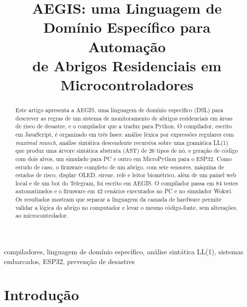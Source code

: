 \documentclass[conference]{IEEEtran}
\begin{document}
\title{AEGIS: uma Linguagem de Domínio Específico para Automação\\
de Abrigos Residenciais em Microcontroladores}

\author{
}

\maketitle

\begin{abstract}
Este artigo apresenta a AEGIS, uma linguagem de domínio específico (DSL)
para descrever as regras de um sistema de monitoramento de abrigos
residenciais em áreas de risco de desastre, e o compilador que a traduz
para Python. O compilador, escrito em JavaScript, é organizado em três
fases: análise léxica por expressões regulares com \textit{maximal munch},
análise sintática descendente recursiva sobre uma gramática LL(1) que
produz uma árvore sintática abstrata (AST) de 26 tipos de nó, e geração de
código com dois alvos, um simulado para PC e outro em MicroPython para o
ESP32. Como estudo de caso, o firmware completo de um abrigo, com sete
sensores, máquina de estados de risco, display OLED, sirene, relé e leitor
biométrico, além de um painel web local e de um bot do Telegram, foi
escrito em AEGIS. O compilador passa em 84 testes automatizados e o
firmware em 42 cenários executados no PC e no simulador Wokwi. Os
resultados mostram que separar a linguagem da camada de hardware permite
validar a lógica do abrigo no computador e levar o mesmo código-fonte,
sem alterações, ao microcontrolador.
\end{abstract}

\begin{IEEEkeywords}
compiladores, linguagem de domínio específico, análise sintática LL(1),
sistemas embarcados, ESP32, prevenção de desastres
\end{IEEEkeywords}

\section{Introdução}
\end{document}

